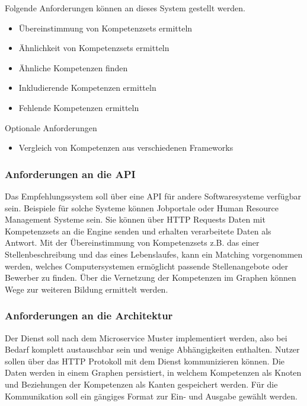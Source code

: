 Folgende Anforderungen können an dieses System gestellt werden.
\begin{itemize}
	\item Übereinstimmung von Kompetenzsets ermitteln
	\item Ähnlichkeit von Kompetenzsets ermitteln
	\item Ähnliche Kompetenzen finden
	\item Inkludierende Kompetenzen ermitteln
	\item Fehlende Kompetenzen ermitteln
\end{itemize}

\vspace{1em}

Optionale Anforderungen

\begin{itemize}
	\item Vergleich von Kompetenzen aus verschiedenen Frameworks
\end{itemize}

\subsubsection{Anforderungen an die API}

Das Empfehlungssystem soll über eine API für andere Softwaresysteme verfügbar sein. Beispiele für solche Systeme können Jobportale oder Human Resource Management Systeme sein. Sie können über HTTP Requests Daten mit Kompetenzsets an die Engine senden und erhalten verarbeitete Daten als Antwort.
Mit der Übereinstimmung von Kompetenzsets z.B. das einer Stellenbeschreibung und das eines Lebenslaufes, kann ein Matching vorgenommen werden, welches Computersystemen ermöglicht passende Stellenangebote oder Bewerber zu finden. Über die Vernetzung der Kompetenzen im Graphen können Wege zur weiteren Bildung ermittelt werden.


\subsubsection{Anforderungen an die Architektur}

Der Dienst soll nach dem Microservice Muster implementiert werden, also bei Bedarf komplett austauschbar sein und wenige Abhängigkeiten enthalten. Nutzer sollen über das HTTP Protokoll mit dem Dienst kommunizieren können. Die Daten werden in einem Graphen persistiert, in welchem Kompetenzen als Knoten und Beziehungen der Kompetenzen als Kanten gespeichert werden. Für die Kommunikation soll ein gängiges Format zur Ein- und Ausgabe gewählt werden.

